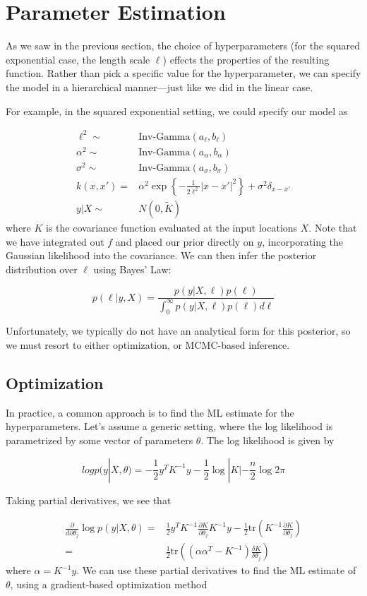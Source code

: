 \documentclass[twoside]{article}
\begin{document}
  
\section{Parameter Estimation}


As we saw in the previous section, the choice of hyperparameters (for the squared exponential case, the length scale $\ell$) effects the properties of the resulting function. Rather than pick a specific value for the hyperparameter, we can specify the model in a hierarchical manner---just like we did in the linear case.

For example, in the squared exponential setting, we could specify our model as

$$\begin{aligned}
  \ell^2 \sim& \mbox{Inv-Gamma}(a_\ell, b_\ell)\\
  \alpha^2 \sim& \mbox{Inv-Gamma}(a_\alpha, b_\alpha)\\
  \sigma^2 \sim& \mbox{Inv-Gamma}(a_\sigma, b_\sigma)\\
  k(x,x') =& \alpha^2\exp\left\{-\frac{1}{2\ell^2}|x-x'|^2\right\}+\sigma^2\delta_{x-x'}\\
  y|X \sim& N(0,\tilde{K})
\end{aligned}
$$
where $K$ is the covariance function evaluated at the input locations $X$. Note that we have integrated out $f$ and placed our prior directly on $y$, incorporating the Gaussian likelihood into the covariance. We can then infer the posterior distribution over $\ell$ using Bayes' Law:

 $$p(\ell|y,X) = \frac{p(y|X,\ell)p(\ell)}{\int_0^\infty p(y|X,\ell)p(\ell)d\ell}$$

 Unfortunately, we typically do not have an analytical form for this posterior, so we must resort to either optimization, or MCMC-based inference.

 \subsection{Optimization}
 In practice, a common approach is to find the ML estimate for the hyperparameters. Let's assume a generic setting, where the log likelihood is parametrized by some vector of parameters $\theta$. The log likelihood is given by

 $$log p(y|X,\theta) = -\frac{1}{2}y^TK^{-1}y - \frac{1}{2}\log|K|-\frac{n}{2}\log 2 \pi$$

 Taking partial derivatives, we see that

 $$\begin{aligned}\frac{\partial}{d\partial \theta_j} \log p(y|X,\theta) =& \frac{1}{2}y^TK^{-1}\frac{\partial K}{\partial \theta_j} K^{-1}y - \frac{1}{2}\mbox{tr}\left(K^{-1}\frac{\partial K}{\partial \theta_j}\right)\\
   =& \frac{1}{2}\mbox{tr}\left((\alpha \alpha^T - K^{-1})\frac{\delta K}{\delta \theta_j}\right)\end{aligned}
 $$
 where $\alpha = K^{-1}y$. We can use these partial derivatives to find the ML estimate of $\theta$, using a gradient-based optimization method
\end{document}
